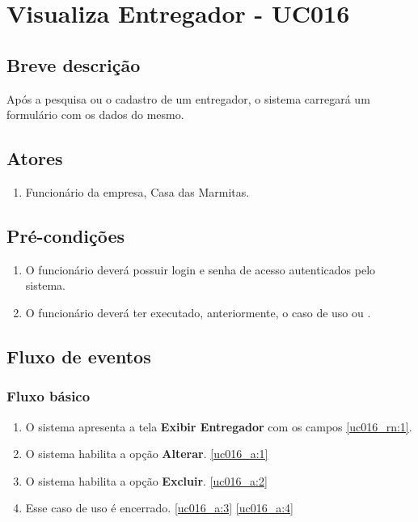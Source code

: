 \chapter{Visualiza Entregador - UC016} \label{uc016}

\section{Breve descrição}

Após a pesquisa ou o cadastro de um entregador, o sistema carregará um formulário com os dados do mesmo.

\section{Atores}

\begin{enumerate}
	\item Funcionário da empresa, Casa das Marmitas.
\end{enumerate}

\section{Pré-condições}

\begin{enumerate}
	\item O funcionário deverá possuir login e senha de acesso autenticados pelo sistema.
	\item O funcionário deverá ter executado, anteriormente, o caso de uso  ou .
\end{enumerate}

\section{Fluxo de eventos}

\subsection{Fluxo básico}

\begin{enumerate}[label=P\arabic*]
	\item O sistema apresenta a tela \textbf{Exibir Entregador} com os campos \ref{uc016_rn:1}. \label{uc016_p:1}
	\item O sistema habilita a opção \textbf{Alterar}. \label{uc016_p:2}\ref{uc016_a:1} 
	\item O sistema habilita a opção \textbf{Excluir}. \label{uc016_p:3}\ref{uc016_a:2}
	\item Esse caso de uso é encerrado. \label{uc016_p:4}\ref{uc016_a:3} \ref{uc016_a:4}
\end{enumerate}

